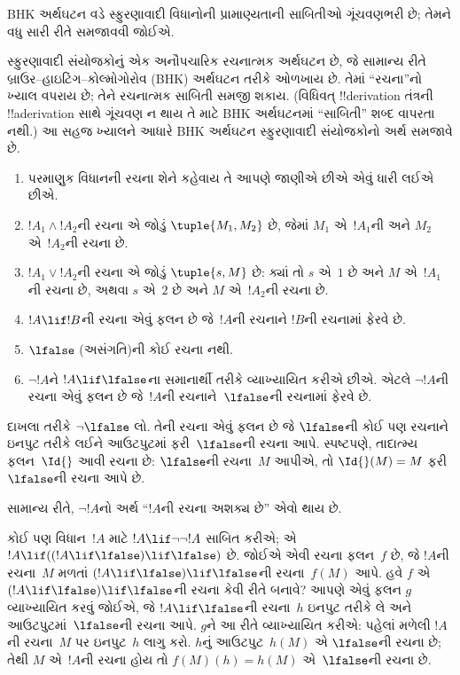 \documentclass[../../../include/open-logic-section]{subfiles}
\begin{document}


\begin{editorial}
  BHK અર્થઘટન વડે સ્ફુરણાવાદી વિધાનોની પ્રામાણ્યતાની
  સાબિતીઓ ગૂંચવણભરી છે; તેમને વધુ સારી રીતે સમજાવવી જોઈએ.
\end{editorial}

સ્ફુરણાવાદી સંયોજકોનું એક અનૌપચારિક રચનાત્મક અર્થઘટન છે, જે
સામાન્ય રીતે બ્રાઉર--હાઇટિંગ--કોલ્મોગોરોવ (BHK) અર્થઘટન તરીકે
ઓળખાય છે. તેમાં ``રચના''નો ખ્યાલ વપરાય છે; તેને રચનાત્મક
સાબિતી સમજી શકાય. (વિધિવત્ !!{derivation} તંત્રની
!!a{derivation} સાથે ગૂંચવણ ન થાય તે માટે BHK અર્થઘટનમાં
``સાબિતી'' શબ્દ વાપરતા નથી.) આ સહજ ખ્યાલને આધારે BHK
અર્થઘટન સ્ફુરણાવાદી સંયોજકોનો અર્થ સમજાવે છે.

\begin{enumerate}
\item પરમાણુક વિધાનની રચના શેને કહેવાય તે આપણે જાણીએ છીએ એવું
  ધારી લઈએ છીએ.
\item $!A_1 \land !A_2$ની રચના એ જોડું $\tuple{M_1, M_2}$ છે,
  જેમાં $M_1$ એ~$!A_1$ની અને $M_2$ એ~$!A_2$ની રચના છે.
\item $!A_1 \lor !A_2$ની રચના એ જોડું $\tuple{s, M}$ છે:
  ક્યાં તો $s$ એ~$1$ છે અને $M$ એ~$!A_1$ની રચના છે, અથવા
  $s$ એ~$2$ છે અને $M$ એ~$!A_2$ની રચના છે.
\item $!A \lif !B$ની રચના એવું ફલન છે જે~$!A$ની રચનાને
  $!B$ની રચનામાં ફેરવે છે.
\item $\lfalse$ (અસંગતિ)ની કોઈ રચના નથી.
\item $\lnot !A$ને $!A \lif \lfalse$ના સમાનાર્થી તરીકે
  વ્યાખ્યાયિત કરીએ છીએ. એટલે $\lnot !A$ની રચના એવું ફલન છે
  જે~$!A$ની રચનાને~$\lfalse$ની રચનામાં ફેરવે છે.
\end{enumerate}

\begin{ex}
દાખલા તરીકે $\lnot \lfalse$ લો. તેની રચના એવું ફલન છે જે
$\lfalse$ની કોઈ પણ રચનાને ઇનપુટ તરીકે લઈને આઉટપુટમાં
ફરી~$\lfalse$ની રચના આપે. સ્પષ્ટપણે, તાદાત્મ્ય
ફલન~$\Id{}$ આવી રચના છે: $\lfalse$ની રચના~$M$ આપીએ,
તો $\Id{}(M) = M$ ફરી~$\lfalse$ની રચના આપે છે.
\end{ex}

સામાન્ય રીતે, $\lnot !A$નો અર્થ ``$!A$ની રચના અશક્ય છે'' એવો થાય છે.

\begin{ex}
કોઈ પણ વિધાન~$!A$ માટે $!A \lif \lnot \lnot !A$ સાબિત કરીએ;
એ $!A \lif ((!A \lif \lfalse) \lif \lfalse)$ છે. જોઈએ
એવી રચના ફલન~$f$ છે, જે $!A$ની રચના~$M$ મળતાં
$(!A \lif \lfalse) \lif \lfalse$ની રચના~$f(M)$ આપે.
હવે $f$ એ $(!A \lif \lfalse) \lif \lfalse$ની રચના કેવી
રીતે બનાવે? આપણે એવું ફલન $g$ વ્યાખ્યાયિત કરવું જોઈએ,
જે $!A \lif \lfalse$ની રચના~$h$ ઇનપુટ તરીકે લે અને
આઉટપુટમાં~$\lfalse$ની રચના આપે. $g$ને આ રીતે વ્યાખ્યાયિત
કરીએ: પહેલાં મળેલી $!A$ની રચના~$M$ પર ઇનપુટ~$h$ લાગુ કરો.
$h$નું આઉટપુટ~$h(M)$ એ $\lfalse$ની રચના છે; તેથી $M$
એ~$!A$ની રચના હોય તો $f(M)(h) = h(M)$ એ~$\lfalse$ની
રચના છે.
\end{ex}
\end{document}
